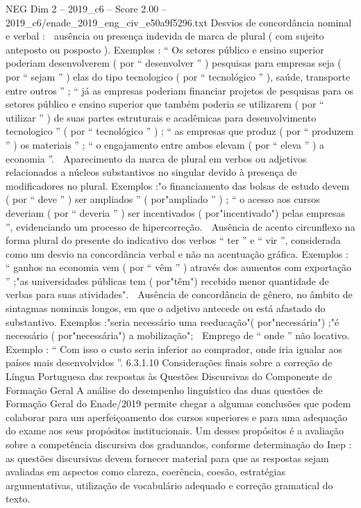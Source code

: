 \begin{textsample}{NEG Dim 2 – 2019\_c6 – Score 2.00 – 2019\_c6/enade\_2019\_eng\_civ\_e50a9f5296.txt}
Desvios de concordância nominal e verbal :  ausência ou presença indevida de marca de plural ( com sujeito anteposto ou posposto ).
Exemplos : “ Os setores público e ensino superior poderiam desenvolverem ( por “ desenvolver ” ) pesquisas para empresas seja ( por “ sejam ” ) elas do tipo tecnologico ( por “ tecnológico ” ), saúde, transporte entre outros ” ; “ já as empresas poderiam financiar projetos de pesquisas para os setores público e ensino superior que também poderia se utilizarem ( por “ utilizar ” ) de suas partes estruturais e acadêmicas para desenvolvimento tecnologico ” ( por “ tecnológico ” ) ; “ as empresas que produz ( por “ produzem ” ) os materiais ” ; “ o engajamento entre ambos elevam ( por “ eleva ” ) a economia ”.  Aparecimento da marca de plural em verbos ou adjetivos relacionados a núcleos substantivos no singular devido à presença de modificadores no plural.
Exemplos :"o financiamento das bolsas de estudo devem ( por “ deve ” ) ser ampliados ” ( por"ampliado ” ) ; “ o acesso aos cursos deveriam ( por “ deveria ” ) ser incentivados ( por"incentivado") pelas empresas ”, evidenciando um processo de hipercorreção.  Ausência de acento circunflexo na forma plural do presente do indicativo dos verbos “ ter ” e “ vir ”, considerada como um desvio na concordância verbal e não na acentuação gráfica.
Exemplos : “ ganhos na economia vem ( por “ vêm ” ) através dos aumentos com exportação ” ;"as universidades públicas tem ( por"têm") recebido menor quantidade de verbas para suas atividades".  Ausência de concordância de gênero, no âmbito de sintagmas nominais longos, em que o adjetivo antecede ou está afastado do substantivo.
Exemplos :"seria necessário uma reeducação"( por"necessária") ;"é necessário ( por"necessária") a mobilização";  Emprego de “ onde ” não locativo.
Exemplo : “ Com isso o custo seria inferior ao comprador, onde iria igualar aos países mais desenvolvidos ”. 6.3.1.10 Considerações finais sobre a correção de Língua Portuguesa das respostas às Questões Discursivas do Componente de Formação Geral A análise do desempenho linguístico das duas questões de Formação Geral do Enade/2019 permite chegar a algumas conclusões que podem colaborar para um aperfeiçoamento dos cursos superiores e para uma adequação do exame aos seus propósitos institucionais.
Um desses propósitos é a avaliação sobre a competência discursiva dos graduandos, conforme determinação do Inep : as questões discursivas devem fornecer material para que as respostas sejam avaliadas em aspectos como clareza, coerência, coesão, estratégias argumentativas, utilização de vocabulário adequado e correção gramatical do texto.

\end{textsample}
